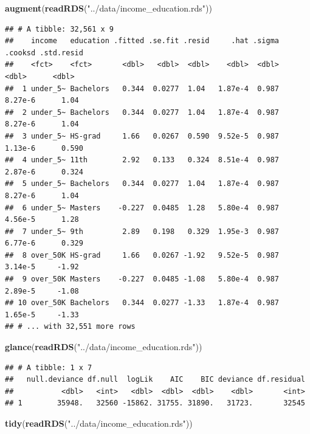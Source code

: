 \documentclass[]{article}
\newenvironment{Shaded}{\begin{snugshade}}{\end{snugshade}}
\newcommand{\KeywordTok}[1]{\textcolor[rgb]{0.13,0.29,0.53}{\textbf{#1}}}
\newcommand{\NormalTok}[1]{#1}
\newcommand{\StringTok}[1]{\textcolor[rgb]{0.31,0.60,0.02}{#1}}
\begin{document}
\begin{Shaded}
\begin{Highlighting}[]
\KeywordTok{augment}\NormalTok{(}\KeywordTok{readRDS}\NormalTok{(}\StringTok{"../data/income\_education.rds"}\NormalTok{))}
\end{Highlighting}
\end{Shaded}

\begin{verbatim}
## # A tibble: 32,561 x 9
##    income   education .fitted .se.fit .resid     .hat .sigma  .cooksd .std.resid
##    <fct>    <fct>       <dbl>   <dbl>  <dbl>    <dbl>  <dbl>    <dbl>      <dbl>
##  1 under_5~ Bachelors   0.344  0.0277  1.04   1.87e-4  0.987  8.27e-6      1.04 
##  2 under_5~ Bachelors   0.344  0.0277  1.04   1.87e-4  0.987  8.27e-6      1.04 
##  3 under_5~ HS-grad     1.66   0.0267  0.590  9.52e-5  0.987  1.13e-6      0.590
##  4 under_5~ 11th        2.92   0.133   0.324  8.51e-4  0.987  2.87e-6      0.324
##  5 under_5~ Bachelors   0.344  0.0277  1.04   1.87e-4  0.987  8.27e-6      1.04 
##  6 under_5~ Masters    -0.227  0.0485  1.28   5.80e-4  0.987  4.56e-5      1.28 
##  7 under_5~ 9th         2.89   0.198   0.329  1.95e-3  0.987  6.77e-6      0.329
##  8 over_50K HS-grad     1.66   0.0267 -1.92   9.52e-5  0.987  3.14e-5     -1.92 
##  9 over_50K Masters    -0.227  0.0485 -1.08   5.80e-4  0.987  2.89e-5     -1.08 
## 10 over_50K Bachelors   0.344  0.0277 -1.33   1.87e-4  0.987  1.65e-5     -1.33 
## # ... with 32,551 more rows
\end{verbatim}

\begin{Shaded}
\begin{Highlighting}[]
\KeywordTok{glance}\NormalTok{(}\KeywordTok{readRDS}\NormalTok{(}\StringTok{"../data/income\_education.rds"}\NormalTok{))}
\end{Highlighting}
\end{Shaded}

\begin{verbatim}
## # A tibble: 1 x 7
##   null.deviance df.null  logLik    AIC    BIC deviance df.residual
##           <dbl>   <int>   <dbl>  <dbl>  <dbl>    <dbl>       <int>
## 1        35948.   32560 -15862. 31755. 31890.   31723.       32545
\end{verbatim}

\begin{Shaded}
\begin{Highlighting}[]
\KeywordTok{tidy}\NormalTok{(}\KeywordTok{readRDS}\NormalTok{(}\StringTok{"../data/income\_education.rds"}\NormalTok{))}
\end{Highlighting}
\end{Shaded}
\end{document}

